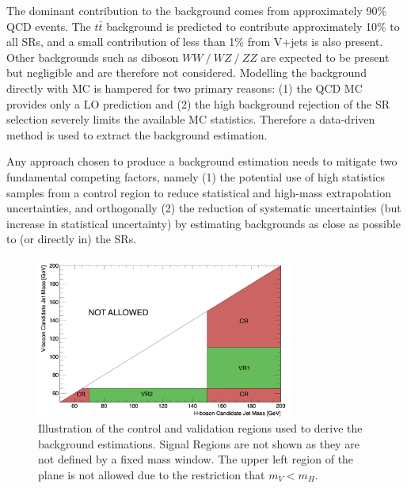The dominant contribution to the background comes from approximately 90\% QCD events.
The $t\bar{t}$ background is predicted to contribute approximately 10\% to all SRs, and a small contribution of less than 1\% from V+jets is also present.
Other backgrounds such as diboson $WW\ /\ WZ\ /\ ZZ$ are expected to be present but negligible and are therefore not considered.
Modelling the background directly with MC is hampered for two primary reasons: (1) the QCD MC provides only a LO prediction and (2) the high background rejection of the SR selection severely limits the available MC statistics.
Therefore a data-driven method is used to extract the background estimation.

Any approach chosen to produce a background estimation needs to mitigate two fundamental competing factors, namely (1) the potential use of high statistics samples from a control region to reduce statistical and high-mass extrapolation uncertainties, and orthogonally (2) the reduction of systematic uncertainties (but increase in statistical uncertainty) by estimating backgrounds as close as possible to (or directly in) the SRs.

\begin{figure}[htbp!]
\begin{center}
    \includegraphics[width=0.75\textwidth]{CR_VR_Plane_Plot.pdf}
\end{center}
\caption{Illustration of the control and validation regions used to derive the background estimations. Signal Regions are not shown as they are not defined by a fixed mass window. The upper left region of the plane is not allowed due to the restriction that $m_V < m_H$.}
\label{fig:crvr_plane}
\end{figure}

